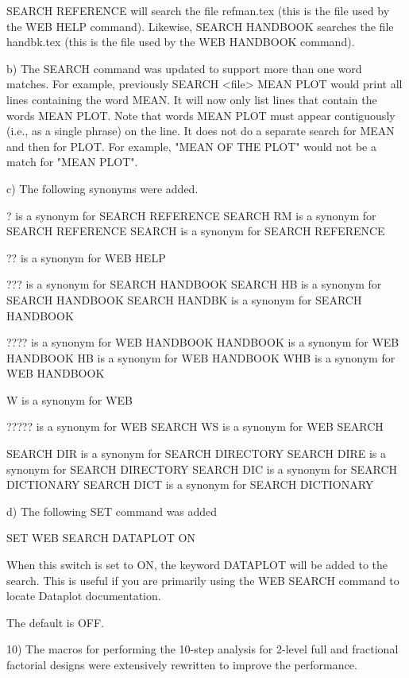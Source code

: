        SEARCH REFERENCE will search the file refman.tex (this is the
       file used by the WEB HELP command).  Likewise, SEARCH HANDBOOK
       searches the file handbk.tex (this is the file used by the
       WEB HANDBOOK command).

    b) The SEARCH command was updated to support more than one
       word matches.  For example, previously
       SEARCH <file> MEAN PLOT would print all lines containing the
       word MEAN.  It will now only list lines that contain the
       words MEAN PLOT.  Note that words MEAN PLOT must appear
       contiguously (i.e., as a single phrase) on the line.
       It does not do a separate search for MEAN and then for
       PLOT.  For example, "MEAN OF THE PLOT" would not be a
       match for "MEAN PLOT".

    c) The following synonyms were added.

          ? is a synonym for SEARCH REFERENCE
          SEARCH RM is a synonym for SEARCH REFERENCE
          SEARCH is a synonym for SEARCH REFERENCE

          ?? is a synonym for WEB HELP

          ??? is a synonym for SEARCH HANDBOOK
          SEARCH HB is a synonym for SEARCH HANDBOOK
          SEARCH HANDBK is a synonym for SEARCH HANDBOOK

          ???? is a synonym for WEB HANDBOOK
          HANDBOOK is a synonym for WEB HANDBOOK
          HB is a synonym for WEB HANDBOOK
          WHB is a synonym for WEB HANDBOOK

          W is a synonym for WEB

          ????? is a synonym for WEB SEARCH
          WS is a synonym for WEB SEARCH

          SEARCH DIR is a synonym for SEARCH DIRECTORY
          SEARCH DIRE is a synonym for SEARCH DIRECTORY
          SEARCH DIC is a synonym for SEARCH DICTIONARY
          SEARCH DICT is a synonym for SEARCH DICTIONARY

    d) The following SET command was added

          SET WEB SEARCH DATAPLOT ON

       When this switch is set to ON, the keyword DATAPLOT will be added
       to the search.  This is useful if you are primarily using the
       WEB SEARCH command to locate Dataplot documentation.

       The default is OFF.

10) The macros for performing the 10-step analysis for 2-level full and
    fractional factorial designs were extensively rewritten to improve
    the performance.

